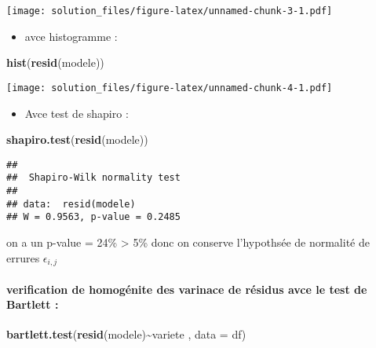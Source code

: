 \documentclass[
]{article}
\newenvironment{Shaded}{\begin{snugshade}}{\end{snugshade}}
\newcommand{\AttributeTok}[1]{\textcolor[rgb]{0.13,0.29,0.53}{#1}}
\newcommand{\FunctionTok}[1]{\textcolor[rgb]{0.13,0.29,0.53}{\textbf{#1}}}
\newcommand{\NormalTok}[1]{#1}
\newcommand{\SpecialCharTok}[1]{\textcolor[rgb]{0.81,0.36,0.00}{\textbf{#1}}}
\providecommand{\tightlist}{%
  \setlength{\itemsep}{0pt}\setlength{\parskip}{0pt}}
\begin{document}
\texttt{[image: solution\_files/figure-latex/unnamed-chunk-3-1.pdf]}

\begin{itemize}
\tightlist
\item
  avce histogramme :
\end{itemize}

\begin{Shaded}
\begin{Highlighting}[]
\FunctionTok{hist}\NormalTok{(}\FunctionTok{resid}\NormalTok{(modele))}
\end{Highlighting}
\end{Shaded}

\texttt{[image: solution\_files/figure-latex/unnamed-chunk-4-1.pdf]}

\begin{itemize}
\tightlist
\item
  Avce test de shapiro :
\end{itemize}

\begin{Shaded}
\begin{Highlighting}[]
\FunctionTok{shapiro.test}\NormalTok{(}\FunctionTok{resid}\NormalTok{(modele))}
\end{Highlighting}
\end{Shaded}

\begin{verbatim}
## 
##  Shapiro-Wilk normality test
## 
## data:  resid(modele)
## W = 0.9563, p-value = 0.2485
\end{verbatim}

on a un p-value = 24\% \textgreater{} 5\% donc on conserve l'hypothsée
de normalité de errures \(\epsilon_{i,j}\)

\hypertarget{verification-de-homoguxe9nite-des-varinace-de-ruxe9sidus-avce-le-test-de-bartlett}{%
\paragraph{verification de homogénite des varinace de résidus avce le
test de Bartlett
:}\label{verification-de-homoguxe9nite-des-varinace-de-ruxe9sidus-avce-le-test-de-bartlett}}

\begin{Shaded}
\begin{Highlighting}[]
\FunctionTok{bartlett.test}\NormalTok{(}\FunctionTok{resid}\NormalTok{(modele)}\SpecialCharTok{\textasciitilde{}}\NormalTok{variete , }\AttributeTok{data =}\NormalTok{ df)}
\end{Highlighting}
\end{Shaded}
\end{document}
